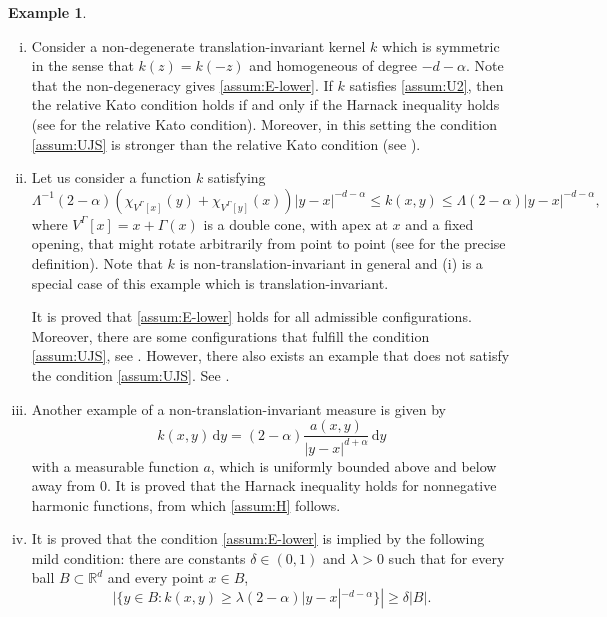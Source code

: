 \documentclass[reqno]{amsart}
\theoremstyle{plain}
\theoremstyle{definition}
\newtheorem{example}[theorem]{Example}
\numberwithin{equation}{section}
\newcommand{\Rd}{\mathbb{R}^d}
\newcommand{\dy} {\, \mathrm{d}y}
\begin{document}
\begin{example}
\begin{enumerate}[(i)]
\item
Consider a non-degenerate translation-invariant kernel $k$ which is symmetric in the sense that $k(z) = k(-z)$ and homogeneous of degree $-d-\alpha$. Note that the non-degeneracy gives \eqref{assum:E-lower}. If $k$ satisfies \eqref{assum:U2}, then the relative Kato condition holds if and only if the Harnack inequality holds (see \cite{BoSz05} for the relative Kato condition). Moreover, in this setting the condition \eqref{assum:UJS} is stronger than the relative Kato condition (see \cite[Theorem B.6]{Sch20}).

\item
Let us consider a function $k$ satisfying
\begin{equation*}
\Lambda^{-1}(2-\alpha) \left( \chi_{V^\Gamma[x]}(y) + \chi_{V^\Gamma[y]}(x) \right) |y-x|^{-d-\alpha} \leq k(x, y) \leq \Lambda (2-\alpha) |y-x|^{-d-\alpha}, 
\end{equation*}
where $V^\Gamma[x] = x + \Gamma(x)$ is a double cone, with apex at $x$ and a fixed opening, that might rotate arbitrarily from point to point (see \cite{BKS19} for the precise definition). Note that $k$ is non-translation-invariant in general and  (i) is a special case of this example which is translation-invariant.

It is proved \cite{BKS19} that \eqref{assum:E-lower} holds for all admissible configurations. Moreover, there are some configurations that fulfill the condition \eqref{assum:UJS}, see \cite[Lemma 12.2]{Sch20}. However, there also exists an example that does not satisfy the condition \eqref{assum:UJS}. See \cite[Section 12.1]{Sch20}.

\item
Another example of a non-translation-invariant measure is given by
\begin{equation*}
k(x,y) \dy = (2-\alpha) \frac{a(x, y)}{|y-x|^{d+\alpha}} \dy
\end{equation*}
with a measurable function $a$, which is uniformly bounded above and below away from 0. It is proved \cite{BaLe02} that the Harnack inequality holds for nonnegative harmonic functions, from which \eqref{assum:H} follows.

\item
It is proved \cite{ChSi20} that the condition \eqref{assum:E-lower} is implied by the following mild condition: there are constants $\delta \in (0,1)$ and $\lambda > 0$ such that for every ball $B \subset \Rd$ and every point $x \in B$,
\begin{equation*}
|\lbrace y \in B : k(x,y) \geq \lambda (2-\alpha) |y-x|^{-d-\alpha} \rbrace | \geq \delta |B|.
\end{equation*}
\end{enumerate}
\end{example}
\end{document}
